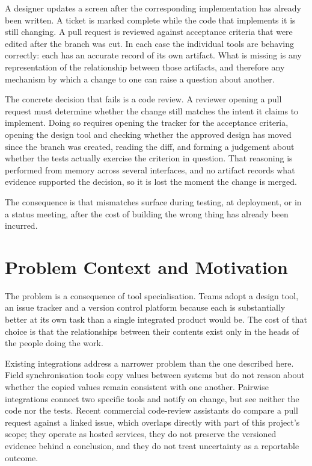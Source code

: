 A designer updates a screen after the corresponding implementation has already
been written. A ticket is marked complete while the code that implements it is
still changing. A pull request is reviewed against acceptance criteria that were
edited after the branch was cut. In each case the individual tools are behaving
correctly: each has an accurate record of its own artifact. What is missing is
any representation of the relationship between those artifacts, and therefore
any mechanism by which a change to one can raise a question about another.

The concrete decision that fails is a code review. A reviewer opening a pull
request must determine whether the change still matches the intent it claims to
implement. Doing so requires opening the tracker for the acceptance criteria,
opening the design tool and checking whether the approved design has moved since
the branch was created, reading the diff, and forming a judgement about whether
the tests actually exercise the criterion in question. That reasoning is
performed from memory across several interfaces, and no artifact records what
evidence supported the decision, so it is lost the moment the change is merged.

The consequence is that mismatches surface during testing, at deployment, or in
a status meeting, after the cost of building the wrong thing has already been
incurred.

\section{Problem Context and Motivation}

The problem is a consequence of tool specialisation. Teams adopt a design tool,
an issue tracker and a version control platform because each is substantially
better at its own task than a single integrated product would be. The cost of
that choice is that the relationships between their contents exist only in the
heads of the people doing the work.

Existing integrations address a narrower problem than the one described here.
Field synchronisation tools copy values between systems but do not reason about
whether the copied values remain consistent with one another. Pairwise
integrations connect two specific tools and notify on change, but see neither the
code nor the tests. Recent commercial code-review assistants do compare a pull
request against a linked issue, which overlaps directly with part of this
project's scope; they operate as hosted services, they do not preserve the
versioned evidence behind a conclusion, and they do not treat uncertainty as a
reportable outcome.

